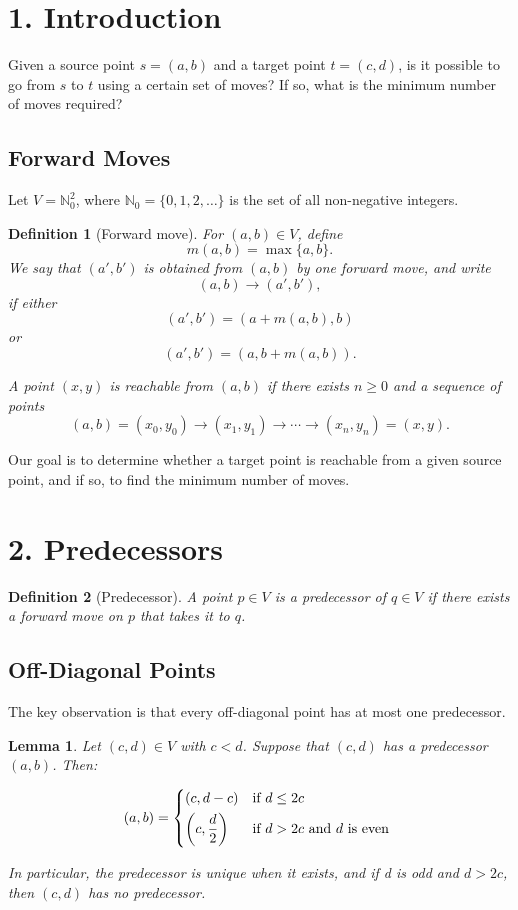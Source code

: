 \documentclass{article}
\newtheorem{definition}{Definition}
\newtheorem{lemma}{Lemma}
\begin{document}
\section*{1. Introduction}

Given a source point $s = (a, b)$ and a target point $t = (c, d)$, is it possible to go from $s$ to $t$ using a certain set of moves?
If so, what is the minimum number of moves required?

\subsection*{Forward Moves}

Let  $V=\mathbb{N}_0^2$, where $\mathbb{N}_0=\{0,1,2,\ldots\}$ is the set of all non-negative integers.

\begin{definition}[Forward move]
	For $(a,b)\in V$, define
	\[
		m(a,b)=\max\{a,b\}.
	\]
	We say that $(a',b')$ is obtained from $(a,b)$ by one
	\emph{forward move}, and write
	\[
		(a,b)\longrightarrow(a',b'),
	\]
	if either
	\[
		(a',b')=(a+m(a,b),b)
	\]
	or
	\[
		(a',b')=(a,b+m(a,b)).
	\]

	A point $(x,y)$ is \emph{reachable} from $(a,b)$ if there exists
	$n\geq 0$ and a sequence of points
	\[
		(a,b)=(x_0,y_0)\longrightarrow
		(x_1,y_1)\longrightarrow\cdots\longrightarrow
		(x_n,y_n)=(x,y).
	\]

\end{definition}

Our goal is to determine whether a target point is reachable from a
given source point, and if so, to find the minimum number of moves.


\section*{2. Predecessors}

\begin{definition}[Predecessor]
	A point $p \in V$ is a predecessor of $q \in V$ if there exists a forward move on $p$ that takes it to
	$q$.
\end{definition}

\subsection*{Off-Diagonal Points}

The key observation is that every off-diagonal point has at most one predecessor.

\begin{lemma}
	Let $(c,d)\in V$ with $c<d$.
	Suppose that $(c,d)$ has a predecessor $(a,b)$. Then:

	\[
		(a,b)= \begin{dcases*}
			(c,d-c)                 & if $d \leq 2c$            \\
			\left(c,\frac d2\right) & if $d>2c$ and $d$ is even
		\end{dcases*}
	\]

	In particular, the predecessor is unique when it exists, and if d is odd and $d > 2c$,
	then $(c,d)$ has no predecessor.

\end{lemma}
\end{document}
